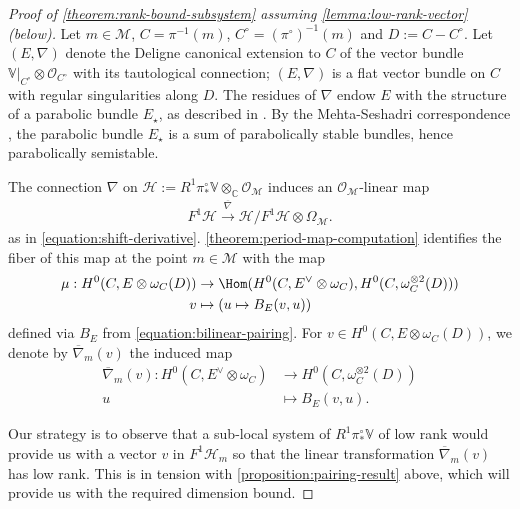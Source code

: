 \begin{proof}[Proof of \autoref{theorem:rank-bound-subsystem} assuming
	\autoref{lemma:low-rank-vector} (below)]
Let $m \in \mathscr{M}$, $C=\pi^{-1}(m)$, $C^\circ = (\pi^{\circ})^{-1}(m)$
and $D := C - C^\circ$.
Let $(E, \nabla)$ denote the
Deligne canonical extension
to $C$ of the vector bundle $\mathbb V|_{C^\circ} \otimes \mathscr O_{C^\circ}$ with its tautological connection; $(E,\nabla)$ is a flat vector bundle on $C$ with regular singularities along $D$. The residues of $\nabla$ endow $E$ with the structure of a parabolic bundle $E_\star$, as described in \cite[Definition 3.3.1]{LL:geometric-local-systems}.
By the Mehta-Seshadri correspondence \cite{mehta1980moduli},
the parabolic bundle $E_\star$ is a sum of parabolically stable bundles, hence
parabolically semistable.

The connection $\nabla$ on $\mathscr{H} := R^1 \pi^\circ_*\mathbb V \otimes_{\mathbb C}
\mathscr O_{\mathscr M}$ induces an $\mathscr O_{\mathscr M}$-linear map
\begin{align*}
	F^1\mathscr{H} \xrightarrow{\overline{\nabla}} \mathscr{H}/F^1 \mathscr{H} \otimes \Omega_{\mathscr M}.
\end{align*}
as in \eqref{equation:shift-derivative}.
\autoref{theorem:period-map-computation} identifies the fiber of this map at the point $m \in \mathscr M$ with the map
\begin{align*}
	\mu: H^0(C, E \otimes \omega_C(D)) &\to \Hom(H^0(C, E^\vee \otimes \omega_C),
	H^0(C, \omega_C^{\otimes	2}(D))) \\
v&\mapsto (u\mapsto B_E(v, u)) \end{align*}
defined via $B_E$ from \eqref{equation:bilinear-pairing}. For $v\in H^0(C, E\otimes \omega_C(D))$, we denote by $\overline{\nabla}_m(v)$ the induced map
\begin{align*}
 \overline{\nabla}_m(v): H^0(C, E^\vee \otimes \omega_C)& \rightarrow H^0(C, \omega_C^{\otimes	2}(D))\\
u & \mapsto B_E(v, u).
\end{align*}

Our strategy is to observe that a sub-local system of $R^1\pi_*^\circ \mathbb{V}$ of low rank would provide us with a vector $v$ in $F^1\mathscr{H}_m$ so that the linear transformation $\overline{\nabla}_m(v)$ has low rank. This is in tension with \autoref{proposition:pairing-result} above, which will provide us with the required dimension bound.


\end{proof}

